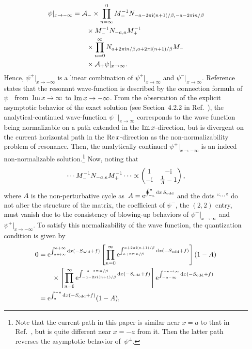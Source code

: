 \begin{align}
    \psi|_{x\to-\infty} &= \mathcal A_-
    \times \prod_{n=\infty}^{0} M_{-}^{-1} N_{-a-2\pi \mathrm{i}  (n+1)/\beta,-a-2\pi \mathrm{i} n/\beta}\notag\\
    &\qquad
    \times M_{-}^{-1} N_{-a,a} M_{+}^{-1} \notag\\
    &\qquad
    \times \prod_{n=0}^{\infty} N_{a+2\pi \mathrm{i} n/\beta,a+2\pi \mathrm{i}  (n+1)/\beta} M_{-}\notag\\
    &\qquad
    \times \mathcal A_+\psi|_{x\to\infty} .
\end{align}
Hence, $\psi^{\pm}|_{x\to-\infty}$ is a linear combination of $\psi^+|_{x\to\infty}$ and $\psi^-|_{x\to\infty}$.
Reference~\cite{Morikawa:2025grx} states that the resonant wave-function is described by the connection formula of $\psi^{-}$ from~$\operatorname{Im} x\to\infty$ to $\operatorname{Im} x\to-\infty$. From the observation of the explicit asymptotic behavior of the exact solution (see Section~4.2.2 in Ref.~\cite{Morikawa:2025grx}), the analytical-continued wave-function $\psi^-|_{x\to\infty}$ corresponds to the wave function being normalizable on a path extended in the $\operatorname{Im} x$-direction, but is divergent on the current horizontal path in the $\operatorname{Re} x$-direction as the non-normalizability problem of resonance. Then, the analytically continued $\psi^+|_{x\to-\infty}$ is an indeed non-normalizable solution.\footnote{Note that the current path in this paper is similar near $x=a$ to that in Ref.~\cite{Morikawa:2025grx}, but is quite different near $x=-a$ from it. Then the latter path reverses the asymptotic behavior of~$\psi^{\pm}$.} Now, noting that
\begin{align}
    \cdots M_{-}^{-1} N_{-a,a} M_{+}^{-1} \cdots \propto
    \begin{pmatrix}
        1 & -\mathrm{i} \\ -\mathrm{i} & \frac{1}{A} - 1
    \end{pmatrix},
\end{align}
where $A$ is the non-perturbative cycle as~$A=\mathrm{e}^{\oint_{-a}^{a}\mathrm{d} x\, S_{\mathrm{odd}}}$ and the dots ``$\cdots$'' do not alter the structure of the matrix,
the coefficient of $\psi^{-}$, the $(2,2)$ entry, must vanish due to the consistency of blowing-up behaviors of $\psi^-|_{x\to\infty}$ and $\psi^+|_{x\to-\infty}$.
To satisfy this normalizability of the wave function,
the quantization condition is given by
\begin{align}
    0 &=\mathrm{e}^{\int_{a+\mathrm{i} \infty}^{a+\infty} \mathrm{d} x (-S_{\mathrm{odd}}+f)}
    \left[\prod_{n=0}^{\infty}
    \mathrm{e}^{\int_{a+2\pi \mathrm{i} n/\beta}^{a+2\pi \mathrm{i}  (n+1)/\beta} \mathrm{d} x (-S_{\mathrm{odd}}+f)}
    \right]
    (1 - A)
    \notag\\&\qquad\times
    \left[\prod_{n=0}^{\infty}
    \mathrm{e}^{\int_{-a-2\pi \mathrm{i}  (n+1)/\beta}^{-a-2\pi \mathrm{i} n/\beta} \mathrm{d} x (-S_{\mathrm{odd}}+f)}
    \right]
    \mathrm{e}^{\int_{-a-\infty}^{-a-\mathrm{i} \infty} \mathrm{d} x (-S_{\mathrm{odd}}+f)}
    \label{src:2505_02301:eq:zel_quantization_0}
    \\
    &= \mathrm{e}^{\int_{a}^{-a} \mathrm{d} x (-S_{\mathrm{odd}}+f)} (1-A),
    \label{src:2505_02301:eq:zel_quantization}
\end{align}
